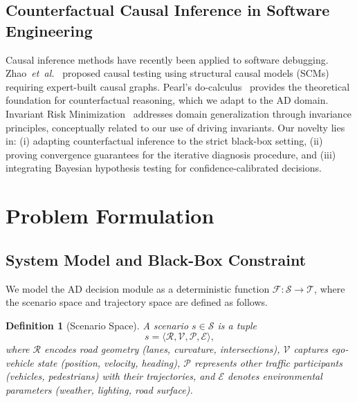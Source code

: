 \documentclass[journal]{IEEEtran}
\theoremstyle{plain}
\newtheorem{definition}{Definition}[section]
\theoremstyle{definition}
\theoremstyle{remark}
\newcommand{\scenario}{\mathcal{S}}
\newcommand{\traj}{\mathcal{T}}
\newcommand{\sys}{\mathcal{F}}
\begin{document}
\subsection{Counterfactual Causal Inference in Software Engineering}

Causal inference methods have recently been applied to software debugging. Zhao~\emph{et~al.}~\cite{zhao2023causal} proposed causal testing using structural causal models (SCMs) requiring expert-built causal graphs. Pearl's do-calculus~\cite{pearl2019probabilistic} provides the theoretical foundation for counterfactual reasoning, which we adapt to the AD domain. Invariant Risk Minimization~\cite{arjovsky2019invariant} addresses domain generalization through invariance principles, conceptually related to our use of driving invariants. Our novelty lies in: (i) adapting counterfactual inference to the strict black-box setting, (ii) proving convergence guarantees for the iterative diagnosis procedure, and (iii) integrating Bayesian hypothesis testing for confidence-calibrated decisions.

\section{Problem Formulation}
\label{sec:prelim}

\subsection{System Model and Black-Box Constraint}

We model the AD decision module as a deterministic function $\sys: \scenario \to \traj$, where the scenario space and trajectory space are defined as follows.

\begin{definition}[Scenario Space]
A scenario $s \in \scenario$ is a tuple
\begin{equation}
s = \langle \mathcal{R}, \mathcal{V}, \mathcal{P}, \mathcal{E} \rangle,
\label{eq:scenario}
\end{equation}
where $\mathcal{R}$ encodes road geometry (lanes, curvature, intersections), $\mathcal{V}$ captures ego-vehicle state (position, velocity, heading), $\mathcal{P}$ represents other traffic participants (vehicles, pedestrians) with their trajectories, and $\mathcal{E}$ denotes environmental parameters (weather, lighting, road surface).
\end{definition}
\end{document}
